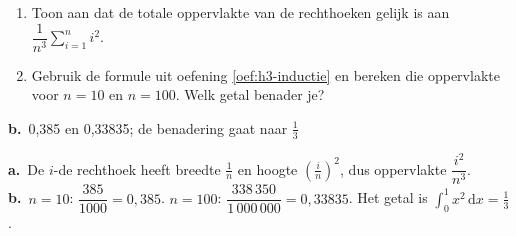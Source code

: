 \begin{oefeningen}
\begin{oefening}[3]
\begin{enumerate}
  \item Toon aan dat de totale oppervlakte van de rechthoeken gelijk is aan $\dfrac{1}{n^3} \displaystyle\sum_{i=1}^{n} i^2$.
  \item Gebruik de formule uit oefening \ref{oef:h3-inductie} en bereken die oppervlakte voor $n = 10$ en $n = 100$. Welk getal benader je?
\end{enumerate}
\begin{solution}
\textbf{b.}~0,385 en 0,33835; de benadering gaat naar $\tfrac13$
\end{solution}
\begin{fullsolution}
\textbf{a.}~De $i$-de rechthoek heeft breedte $\tfrac1n$ en hoogte $(\tfrac{i}{n})^2$, dus oppervlakte $\dfrac{i^2}{n^3}$.\\
\textbf{b.}~$n=10$: $\dfrac{385}{1000}=0{,}385$. $n=100$: $\dfrac{338\,350}{1\,000\,000}=0{,}33835$. Het getal is $\displaystyle\int_0^1 x^2\,\mathrm{d}x=\tfrac13$.
\end{fullsolution}
\end{oefening}
\end{oefeningen}


